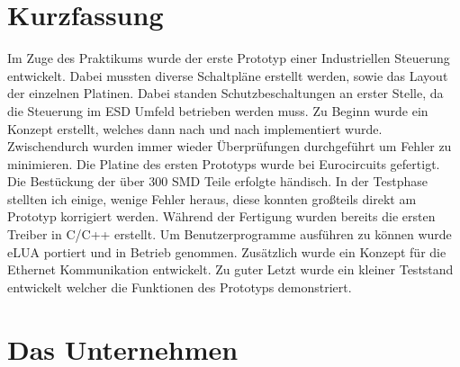 \documentclass[praktikum,german]{hgbthesis}
\begin{document}

\author{Julian Nischler}

\frontmatter
\maketitle
\tableofcontents

\chapter{Kurzfassung}
Im Zuge des Praktikums wurde der erste Prototyp einer Industriellen Steuerung entwickelt. Dabei mussten diverse Schaltpläne erstellt werden, sowie das Layout der einzelnen Platinen. Dabei standen Schutzbeschaltungen an erster Stelle, da die Steuerung im ESD Umfeld betrieben werden muss. Zu Beginn wurde ein Konzept erstellt, welches dann nach und nach implementiert wurde. Zwischendurch wurden immer wieder Überprüfungen durchgeführt um Fehler zu minimieren. Die Platine des ersten Prototyps wurde bei Eurocircuits gefertigt. Die Bestückung der über 300 SMD Teile erfolgte händisch. In der Testphase stellten ich einige, wenige Fehler heraus, diese konnten großteils direkt am Prototyp korrigiert werden. Während der Fertigung wurden bereits die ersten Treiber in C/C++ erstellt. Um Benutzerprogramme ausführen zu können wurde eLUA portiert und in Betrieb genommen. Zusätzlich wurde ein Konzept für die Ethernet Kommunikation entwickelt. Zu guter Letzt wurde ein kleiner Teststand entwickelt welcher die Funktionen des Prototyps demonstriert.


\mainmatter           %

\chapter{Das Unternehmen}
\end{document}
